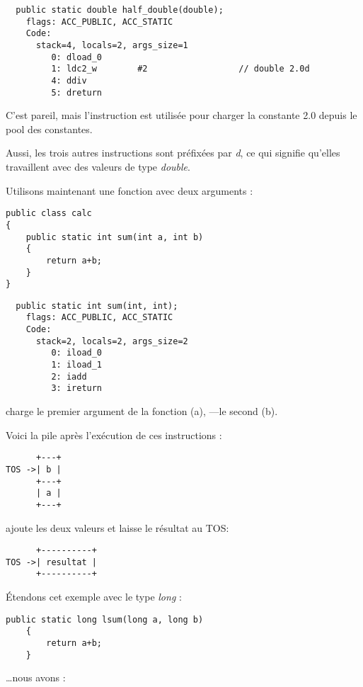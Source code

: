 \begin{lstlisting}
  public static double half_double(double);
    flags: ACC_PUBLIC, ACC_STATIC
    Code:
      stack=4, locals=2, args_size=1
         0: dload_0
         1: ldc2_w        #2                  // double 2.0d
         4: ddiv
         5: dreturn
\end{lstlisting}

C'est pareil, mais l'instruction  est utilisée pour charger la constante
2.0 depuis le pool des constantes.

Aussi, les trois autres instructions sont préfixées par \emph{d},
ce qui signifie qu'elles travaillent avec des valeurs de type \emph{double}.


Utilisons maintenant une fonction avec deux arguments :

\begin{lstlisting}[style=customjava]
public class calc
{
	public static int sum(int a, int b)
	{
		return a+b;
	}
}
\end{lstlisting}

\begin{lstlisting}
  public static int sum(int, int);
    flags: ACC_PUBLIC, ACC_STATIC
    Code:
      stack=2, locals=2, args_size=2
         0: iload_0
         1: iload_1
         2: iadd
         3: ireturn
\end{lstlisting}

 charge le premier argument de la fonction (a), ---le second (b).

Voici la pile après l'exécution de ces instructions :

\begin{lstlisting}
      +---+
TOS ->| b |
      +---+
      | a |
      +---+
\end{lstlisting}

 ajoute les deux valeurs et laisse le résultat au \ac{TOS}:


\begin{lstlisting}
      +----------+
TOS ->| resultat |
      +----------+
\end{lstlisting}

Étendons cet exemple avec le type \emph{long} :


\begin{lstlisting}[style=customjava]
	public static long lsum(long a, long b)
	{
		return a+b;
	}
\end{lstlisting}

\dots nous avons :

